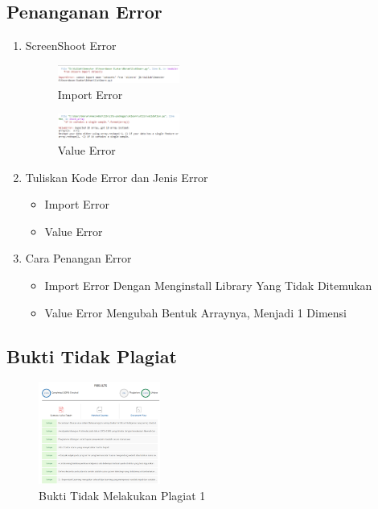\subsection{Penanganan Error}
\begin{enumerate}
	\item ScreenShoot Error
	\begin{figure}[H]
		\includegraphics[width=4cm]{figures/1174031/1/error/1.png}
		\centering
		\caption{Import Error}
	\end{figure}
	\begin{figure}[H]
		\includegraphics[width=4cm]{figures/1174031/1/error/2.png}
		\centering
		\caption{Value Error}
	\end{figure}
	\item Tuliskan Kode Error dan Jenis Error
	\begin{itemize}
		\item Import Error
		\item Value Error
	\end{itemize}
	\item Cara Penangan Error
	\begin{itemize}
		\item Import Error
		\hfill\break
		Dengan Menginstall Library Yang Tidak Ditemukan
		\item Value Error
		\hfill\break
		Mengubah Bentuk Arraynya, Menjadi 1 Dimensi
	\end{itemize}
\end{enumerate}
\subsection{Bukti Tidak Plagiat}
\begin{figure}[H]
	\includegraphics[width=4cm]{figures/1174031/1/plagiat/1.PNG}
	\centering
	\caption{Bukti Tidak Melakukan Plagiat 1}
\end{figure}